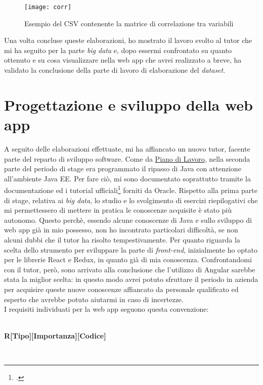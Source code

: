 \begin{figure}[!h]
	\centering
	\texttt{[image: corr]}
	\caption{Esempio del CSV contenente la matrice di correlazione tra variabili}
\end{figure}

Una volta concluse queste elaborazioni, ho mostrato il lavoro svolto al tutor che mi ha seguito per la parte \textit{big data} e, dopo essermi confrontato su quanto ottenuto e su cosa visualizzare nella \gls{web app} che avrei realizzato a breve, ha validato la conclusione della parte di lavoro di elaborazione del \textit{dataset}.

\clearpage
\section{Progettazione e sviluppo della web app}
A seguito delle elaborazioni effettuate, mi ha affiancato un nuovo tutor, facente parte del reparto di sviluppo software. Come da \hyperref[pdl]{Piano di Lavoro}, nella seconda parte del periodo di stage era programmato il ripasso di Java con attenzione all'ambiente Java EE. Per fare ciò, mi sono documentato soprattutto tramite la documentazione ed i tutorial ufficiali\footcite{https://docs.oracle.com/javaee/7/tutorial/index.html} forniti da Oracle. Rispetto alla prima parte di stage, relativa ai \textit{big data}, lo studio e lo svolgimento di esercizi riepilogativi che mi permettessero di mettere in pratica le conoscenze acquisite è stato più autonomo. Questo perchè, essendo alcune conoscenze di Java e sullo sviluppo di \gls{web app} già in mio possesso, non ho incontrato particolari difficoltà, se non alcuni dubbi che il tutor ha risolto tempestivamente.
Per quanto riguarda la scelta dello strumento per sviluppare la parte di \textit{front-end}, inizialmente ho optato per le librerie React e Redux, in quanto già di mia conoscenza. Confrontandomi con il tutor, però, sono arrivato alla conclusione che l'utilizzo di Angular sarebbe stata la miglior scelta: in questo modo avrei potuto sfruttare il periodo in azienda per acquisire queste nuove conoscenze affiancato da personale qualificato ed esperto che avrebbe potuto aiutarmi in caso di incertezze. \\
I requisiti individuati per la \gls{web app} seguono questa convenzione:\\\\
\centerline{\textbf{R[Tipo][Importanza][Codice]}}\\
